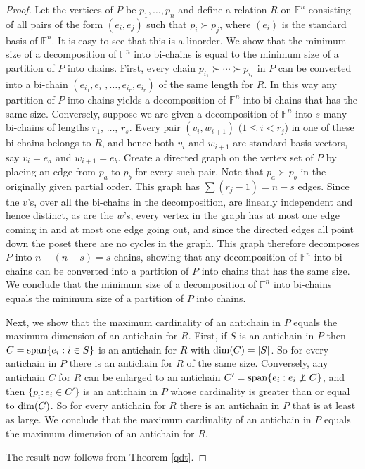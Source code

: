 \documentclass{amsart}
\theoremstyle{definition}
\begin{document}
\begin{proof}
Let the vertices of $P$ be $p_1, \ldots, p_n$ and define a relation $R$ on $\mathbb{F}^n$ consisting of all pairs of the form $(e_i, e_j)$ such that $p_i \succ p_j$, where $(e_i)$ is the standard basis of $\mathbb{F}^n$. It is easy to see that this is a linorder. We show that the minimum size of a decomposition of $\mathbb{F}^n$ into bi-chains is equal to the minimum size of a partition of $P$ into chains. First, every chain $p_{i_1} \succ \cdots \succ p_{i_r}$ in $P$ can be converted into a bi-chain $(e_{i_1}, e_{i_1}, \ldots, e_{i_r}, e_{i_r})$ of the same length for $R$. In this way any partition of $P$ into chains yields a decomposition of $\mathbb{F}^n$ into bi-chains that has the same size. Conversely, suppose we are given a decomposition of $\mathbb{F}^n$ into $s$ many bi-chains of lengths $r_1$, $\ldots$, $r_s$. Every pair $(v_i, w_{i+1})$ ($1 \leq i < r_j$) in one of these bi-chains belongs to $R$, and hence both $v_i$ and $w_{i+1}$ are standard basis vectors, say $v_i = e_a$ and $w_{i+1} = e_b$. Create a directed graph on the vertex set of $P$ by placing an edge from $p_a$ to $p_b$ for every such pair. Note that $p_a \succ p_b$ in the originally given partial order. This graph has $\sum (r_j - 1) = n - s$ edges. Since the $v$'s, over all the bi-chains in the decomposition, are linearly independent and hence distinct, as are the $w$'s, every vertex in the graph has at most one edge coming in and at most one edge going out, and since the directed edges all point down the poset there are no cycles in the graph. This graph therefore decomposes $P$ into $n - (n - s) = s$ chains, showing that any decomposition of $\mathbb{F}^n$ into bi-chains can be converted into a partition of $P$ into chains that has the same size. We conclude that the minimum size of a decomposition of $\mathbb{F}^n$ into bi-chains equals the minimum size of a partition of $P$ into chains.

Next, we show that the maximum cardinality of an antichain in $P$ equals the maximum dimension of an antichain for $R$. First, if $S$ is an antichain in $P$ then $C = {\rm span}\{e_i: i \in S\}$ is an antichain for $R$ with ${\rm dim}(C) = |S|$. So for every antichain in $P$ there is an antichain for $R$ of the same size. Conversely, any antichain $C$ for $R$ can be enlarged to an antichain $C' = {\rm span}\{e_i: e_i \not\perp C\}$, and then $\{p_i: e_i \in C'\}$ is an antichain in $P$ whose cardinality is greater than or equal to ${\rm dim}(C)$. So for every antichain for $R$ there is an antichain in $P$ that is at least as large. We conclude that the maximum cardinality of an antichain in $P$ equals the maximum dimension of an antichain for $R$.

The result now follows from Theorem \ref{qdt}.
\end{proof}
\end{document}
